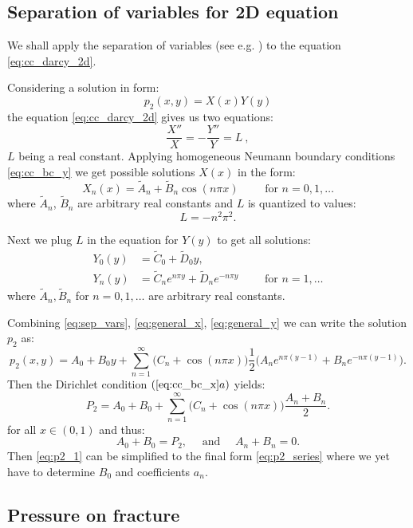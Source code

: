 \documentclass{elsarticle}
\begin{document}
\subsection{\bf Separation of variables for 2D equation}
\label{sec:p2_conductive}

We shall apply the separation of variables  (see e.g. \cite{Evans1998}) to the equation \eqref{eq:cc_darcy_2d}.  


Considering a solution in form:
\begin{equation}
    \label{eq:sep_vars}
    p_2(x,y) = X(x)Y(y) 
\end{equation}
the equation \eqref{eq:cc_darcy_2d} gives us two equations:
\[
\frac{X''}{X} = -\frac{Y''}{Y} = L\ ,
\]
$L$ being a real constant. Applying homogeneous Neumann boundary conditions \eqref{eq:cc_bc_y}
we get possible solutions $X(x)$ in the form: 
\begin{equation}
    \label{eq:general_x}
    X_n(x) = \tilde A_n + \tilde B_n \cos (n\pi x)\qquad \text{ for }n=0,1, \dots
\end{equation}
where $\tilde A_n$, $\tilde B_n$ are arbitrary real constants and $L$ is quantized to values:
\[
    L= - n^2 \pi^2.
\]


Next we plug $L$ in the equation for $Y(y)$ to get all solutions:
\begin{align}
Y_0(y) &= \tilde C_0 + \tilde D_0 y, \nonumber \\
\label{eq:general_y}
Y_n(y) &= \tilde C_n e^{n\pi y}+ \tilde D_n e^{-n\pi y}\qquad \text{ for } n =1, \dots
\end{align}
where $\tilde A_n, \tilde B_n$ for $n=0,1,\dots$ are arbitrary real constants.

Combining \eqref{eq:sep_vars}, \eqref{eq:general_x}, \eqref{eq:general_y} we can write the solution $p_2$ as:
\begin{equation}
    \label{eq:p2_1}
    p_2(x, y) = A_0 + B_0 y + \sum ^{\infty}_{n=1} \big(C_n + \cos (n\pi x)\big) 
            \frac{1}{2}\big(A_n e^{n\pi (y-1)} + B_n e^{-n\pi (y-1)}\big).
\end{equation}
Then the Dirichlet condition $(\ref{eq:cc_bc_x}a)$ yields:
\[
    P_2 = A_0 + B_0 + \sum ^{\infty}_{n=1} \big(C_n + \cos (n\pi x)\big) 
            \frac{A_n  + B_n}{2}.
\]
for all $x\in (0, 1)$ and thus:
\[
    A_0 + B_0 = P_2, \quad\text{ and } \quad A_n+B_n = 0.
\]
Then \eqref{eq:p2_1} can be simplified to the final form \eqref{eq:p2_series} where we yet have to determine $B_0$ and coefficients $a_n$.


\subsection{Pressure on fracture}
\label{sec:p1_conductive}
\end{document}
